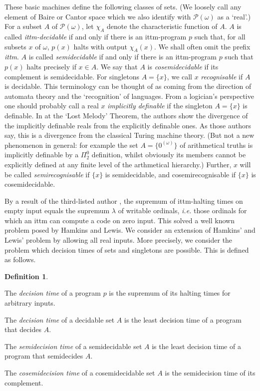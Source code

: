 \documentclass[a4paper,11pt]{amsart}
\theoremstyle{definition}
\newcommand{\pow}{\mathcal{P}}
\newtheorem{definition}[fact]{Definition}
\newtheorem*{problem A}{Problem 1}
\newtheorem*{problem B}{Problem 2}
\theoremstyle{remark}
\newenvironment{enumerate-(a)}{\begin{enumerate}[label={\upshape (\alph*)}, leftmargin=2pc]}{\end{enumerate}}
\begin{document}
These basic  machines define the following classes of sets. (We loosely call any element of Baire or Cantor space which we also identify with $\pow(\omega)$ as a `real'.)
For a subset $A$ of $\pow(\omega)$, let $\chi_A$ denote the characteristic function of $A$. 
$A$ is called \emph{ittm-decidable} if and only if there is an ittm-program $p$ such that, for all subsets $x$ of $\omega$, $p(x)$ halts with output $\chi_A(x)$. 
We shall often omit the prefix \emph{ittm}. 
$A$ is called \emph{semidecidable} if and only if there is an ittm-program $p$ such that $p(x)$ halts precisely if $x\in A$. 
We say that $A$ is \emph{cosemidecidable} if its complement is semidecidable. 
For singletons $A=\{x\}$, we call $x$ \emph{recognisable} if $A$ is decidable. This terminology can be thought of as coming from the direction of automata theory and the `recognition' of languages. From a  logician's perspective one should probably call a  real $x$ {\em implicitly definable} if the singleton $A=\{x\}$ is definable. 
In \cite{hamkins2000infinite} at the `Lost Melody' Theorem, the authors show the divergence of the implicitly definable reals from the explicitly definable ones. As those authors say, this is a divergence from the classical Turing machine theory. (But not a new phenomenon in general: for example the set $A=\{0^{(\omega)}\}$ of arithmetical truths is implicitly definable by a $\Pi^{0}_{2}$ definition, whilst obviously its members cannot be explicitly defined at any finite level of the arthmetical hierarchy.)
Further, $x$ will be called \emph{semirecognisable} if $\{x\}$ is semidecidable, and cosemirecognisable if $\{x\}$ is cosemidecidable. %

By a result of the third-listed author \cite[Theorem 1.1]{welch2000length}, the supremum of ittm-halting times on empty input equals the supremum $\lambda$ of writable ordinals, {\em i.e.} those ordinals for which an ittm can compute a code on zero input. 
This solved a well known problem posed by Hamkins and Lewis. 
We consider an extension of Hamkins' and Lewis' problem by allowing all real inputs. 
More precisely, we consider the problem which decision times of sets and singletons are possible. 
This is defined as follows. 

\begin{definition} \ 
\begin{enumerate-(a)} 
\item 
The \emph{decision time} of a program $p$ is the supremum of its halting times for arbitrary inputs. 
\item 
The \emph{decision time} of a decidable set $A$ is the least decision time of a program that decides $A$. 
\item 
The \emph{semidecision time} of a semidecidable set $A$ is the least decision time of a program that semidecides $A$. 
\item 
The \emph{cosemidecision time} of a cosemidecidable set $A$ is the semidecision time of its complement.
\end{enumerate-(a)} 
\end{definition} 
\end{document}
